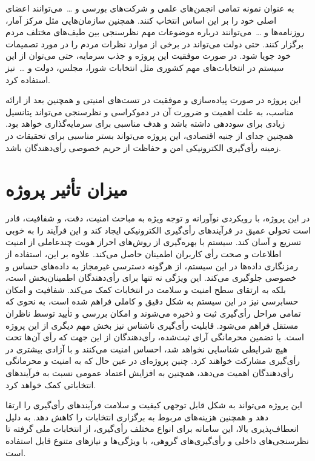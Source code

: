 \documentclass[12pt]{article}
\begin{document}
به عنوان نمونه تمامی انجمن‌های علمی و شرکت‌های بورسی و \ldots\ می‌توانند اعضای اصلی خود را بر این اساس انتخاب کنند. همچنین سازمان‌هایی مثل مرکز آمار، روزنامه‌ها و  \ldots\  می‌توانند درباره موضوعات مهم نظرسنجی بین طیف‌های مختلف مردم برگزار کنند. حتی دولت می‌تواند در برخی از موارد نظرات مردم را در مورد تصمیمات خود جویا شود. در صورت موفقیت این پروژه و جذب سرمایه، حتی می‌توان از این سیستم در انتخابات‌های مهم کشوری مثل انتخابات شورا، مجلس، دولت و  \ldots\  نیز استفاده کرد. 

این پروژه در صورت پیاده‌سازی و موفقیت در تست‌های امنیتی و همچنین بعد از ارائه مناسب، به علت اهمیت و ضرورت آن در دموکراسی و نظرسنجی می‌تواند پتانسیل زیادی برای سوددهی داشته باشد و هدف مناسبی برای سرمایه‌گذاری خواهد بود. همچنین جدای از جنبه اقتصادی، این پروژه می‌تواند بستر مناسبی برای تحقیقات در زمینه رأی‌گیری الکترونیکی امن و حفاظت از حریم خصوصی رأی‌دهندگان باشد. 





\section{میزان تأثیر پروژه}
در این پروژه، با رویکردی نوآورانه و توجه ویژه به مباحث امنیت، دقت، و شفافیت، قادر است تحولی عمیق در فرآیندهای رأی‌گیری الکترونیکی ایجاد کند و این فرآیند را به خوبی تسریع و آسان کند. سیستم با بهره‌گیری از روش‌های احراز هویت چندعاملی از امنیت اطلاعات و صحت رأی کاربران اطمینان حاصل می‌کند. علاوه بر این، استفاده از رمزنگاری داده‌ها در این سیستم، از هرگونه دسترسی غیرمجاز به داده‌های حساس و خصوصی جلوگیری می‌کند. این ویژگی نه تنها برای رأی‌دهندگان اطمینان‌بخش است، بلکه به ارتقای سطح امنیت و سلامت در انتخابات کمک می‌کند. شفافیت و امکان حسابرسی نیز در این سیستم به شکل دقیق و کاملی فراهم شده است، به نحوی که تمامی مراحل رأی‌گیری ثبت و ذخیره می‌شوند و امکان بررسی و تأیید توسط ناظران مستقل فراهم می‌شود.
قابلیت رأی‌گیری ناشناس نیز بخش مهم دیگری از این پروژه است. با تضمین محرمانگی آرای ثبت‌شده، رأی‌دهندگان از این جهت که رأی آن‌ها تحت هیچ شرایطی شناسایی نخواهد شد، احساس امنیت می‌کنند و با آزادی بیشتری در رأی‌گیری مشارکت خواهند کرد. چنین پروژه‌ای در عین حال که به امنیت و محرمانگی رأی‌دهندگان اهمیت می‌دهد، همچنین به افزایش اعتماد عمومی نسبت به فرآیندهای انتخاباتی کمک خواهد کرد.



این پروژه می‌تواند به شکل قابل توجهی کیفیت و سلامت فرآیندهای رأی‌گیری را ارتقا دهد و همچنین هزینه‌های مربوط به برگزاری انتخابات را کاهش دهد. به دلیل انعطاف‌پذیری بالا، این سامانه برای انواع مختلف رأی‌گیری، از انتخابات ملی گرفته تا نظرسنجی‌های داخلی و رأی‌گیری‌های گروهی، با ویژگی‌ها و نیازهای متنوع قابل استفاده است.
\end{document}
